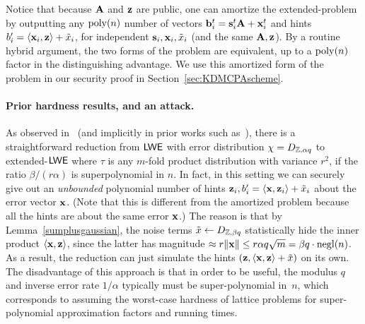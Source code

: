 Notice that because $\mathbf{A}$ and $\mathbf{z}$ are public, one can amortize
the extended-\lwe problem by outputting any $\operatorname{poly}(n)$ number of
vectors $\mathbf{b}_{i}^{t}=\mathbf{s}_{i}^{t} \mathbf{A} + \mathbf{x}_{i}^{t}$ and hints
$b'_{i} = \langle{\ensuremath{\mathbf{x}}_{i}, \ensuremath{\mathbf{z}}}\rangle + \tilde{x}_{i}$, for independent
$\mathbf{s}_{i}, \mathbf{x}_{i}, \tilde{x}_{i}$ (and the same $\mathbf{A}, \mathbf{z}$).
By a routine hybrid argument, the two forms of the problem are
equivalent, up to a $\operatorname{poly}(n)$ factor in the distinguishing advantage.
We use this amortized form of the problem in our security proof in
Section~\ref{sec:KDMCPAscheme}.

\paragraph{Prior hardness results, and an attack.}

As observed in~\cite{DBLP:conf/crypto/ONeillPW11} (and implicitly in
prior works such
as~\cite{DBLP:conf/innovations/GoldwasserKPV10,DBLP:conf/tcc/DodisGKPV10}),
there is a straightforward reduction from $\mathsf{LWE}$ with error
distribution $\chi=D_{\mathbb{Z},\alpha q}$ to extended-$\mathsf{LWE}$ where $\tau$ is
any $m$-fold product distribution with variance $r^{2}$, if the ratio
$\beta/(r \alpha)$ is superpolynomial in $n$.  In fact, in this
setting we can securely give out an \emph{unbounded} polynomial number
of hints $\mathbf{z}_{i}, b'_{i} = \langle{\ensuremath{\mathbf{x}},\ensuremath{\mathbf{z}}_{i}}\rangle + \tilde{x}_{i}$
about the error vector $\mathbf{x}$.  (Note that this is different from the
amortized problem because all the hints are about the same error
$\mathbf{x}$.)  The reason is that by Lemma~\ref{sumplusgaussian}, the
noise terms $\tilde{x} \gets D_{\mathbb{Z}, \beta q}$ statistically hide the
inner product $\langle{\ensuremath{\mathbf{x}}, \ensuremath{\mathbf{z}}}\rangle$, since the latter has magnitude
$\approx r\lVert{\ensuremath{\mathbf{x}}}\rVert \leq r \alpha q \sqrt{m} = \beta q \cdot
\operatorname{negl}(n)$.  As a result, the reduction can just simulate the hints
$(\mathbf{z}, \langle{\ensuremath{\mathbf{x}}, \ensuremath{\mathbf{z}}}\rangle + \tilde{x})$ on its own.  The
disadvantage of this approach is that in order to be useful, the
modulus $q$ and inverse error rate $1/\alpha$ typically must be
super-polynomial in~$n$, which corresponds to assuming the worst-case
hardness of lattice problems for super-polynomial approximation
factors and running times.



